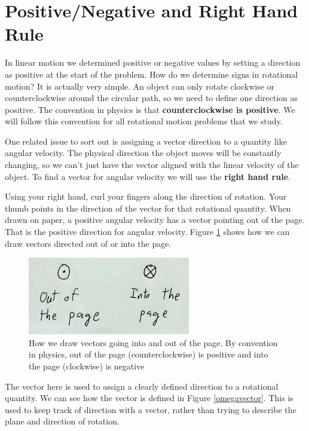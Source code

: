 \documentclass[12pt]{book}
\begin{document}
\section{Positive/Negative and Right Hand Rule}

In linear motion we determined positive or negative values by setting a direction as positive at the start of the problem. How do we determine signs in rotational motion? It is actually very simple. An object can only rotate clockwise or counterclockwise around the circular path, so we need to define one direction as positive. The convention in physics is that \textbf{counterclockwise is positive}. We will follow this convention for all rotational motion problems that we study.



One related issue to sort out is assigning a vector direction to a quantity like angular velocity. The physical direction the object moves will be constantly changing, so we can't just have the vector aligned with the linear velocity of the object. To find a vector for angular velocity we will use the \textbf{right hand rule}.

Using your right hand, curl your fingers along the direction of rotation. Your thumb points in the direction of the vector for that rotational quantity. When drawn on paper, a positive angular velocity has a vector pointing out of the page. That is the positive direction for angular velocity. Figure \ref{rotvector} shows how we can draw vectors directed out of or into the page.


\begin{figure}[t]
\centering
\includegraphics[scale=0.8]{vector_into_out.png}
\caption{How we draw vectors going into and out of the page. By convention in physics, out of the page (counterclockwise) is positive and into the page (clockwise) is negative}
\label{rotvector}
\end{figure}


The vector here is used to assign a clearly defined direction to a rotational quantity. We can see how the vector is defined in Figure \ref{omegavector}. This is used to keep track of direction with a vector, rather than trying to describe the plane and direction of rotation.
\end{document}
